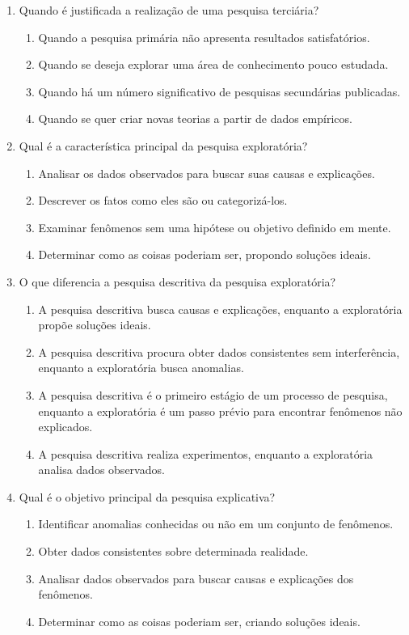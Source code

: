 \documentclass[a4paper,12pt]{article}
\begin{document}
\begin{enumerate}
\item Quando é justificada a realização de uma pesquisa terciária?
    \begin{enumerate}[label=(\alph*)]
        \item Quando a pesquisa primária não apresenta resultados satisfatórios.
        \item Quando se deseja explorar uma área de conhecimento pouco estudada.
        \item Quando há um número significativo de pesquisas secundárias publicadas.
        \item Quando se quer criar novas teorias a partir de dados empíricos.
    \end{enumerate}

    \item Qual é a característica principal da pesquisa exploratória?
    \begin{enumerate}[label=(\alph*)]
        \item Analisar os dados observados para buscar suas causas e explicações.
        \item Descrever os fatos como eles são ou categorizá-los.
        \item Examinar fenômenos sem uma hipótese ou objetivo definido em mente.
        \item Determinar como as coisas poderiam ser, propondo soluções ideais.
    \end{enumerate}

\item O que diferencia a pesquisa descritiva da pesquisa exploratória?
    \begin{enumerate}[label=(\alph*)]
        \item A pesquisa descritiva busca causas e explicações, enquanto a exploratória propõe soluções ideais.
        \item A pesquisa descritiva procura obter dados consistentes sem interferência, enquanto a exploratória busca anomalias.
        \item A pesquisa descritiva é o primeiro estágio de um processo de pesquisa, enquanto a exploratória é um passo prévio para encontrar fenômenos não explicados.
        \item A pesquisa descritiva realiza experimentos, enquanto a exploratória analisa dados observados.
    \end{enumerate}

\item Qual é o objetivo principal da pesquisa explicativa?
    \begin{enumerate}[label=(\alph*)]
        \item Identificar anomalias conhecidas ou não em um conjunto de fenômenos.
        \item Obter dados consistentes sobre determinada realidade.
        \item Analisar dados observados para buscar causas e explicações dos fenômenos.
        \item Determinar como as coisas poderiam ser, criando soluções ideais.
    \end{enumerate}


\end{enumerate}
\end{document}
